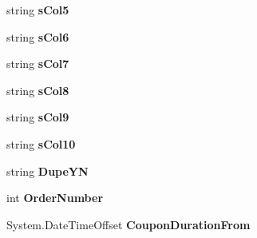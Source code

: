 \begin{DoxyCompactItemize}
\item 
string {\bfseries s\+Col5}\hypertarget{a00068_a726e903f1efbc702ac37385102cd91dd}{}\label{a00068_a726e903f1efbc702ac37385102cd91dd}

\item 
string {\bfseries s\+Col6}\hypertarget{a00068_a5d2ac8fd9022d7689df9229d6acc84b1}{}\label{a00068_a5d2ac8fd9022d7689df9229d6acc84b1}

\item 
string {\bfseries s\+Col7}\hypertarget{a00068_a310fe284da54bbe7d6f0714efd7588cb}{}\label{a00068_a310fe284da54bbe7d6f0714efd7588cb}

\item 
string {\bfseries s\+Col8}\hypertarget{a00068_ac529f8414e68bcd40d6aeb975978071a}{}\label{a00068_ac529f8414e68bcd40d6aeb975978071a}

\item 
string {\bfseries s\+Col9}\hypertarget{a00068_a145a1eff310db6ac8884c103132e803e}{}\label{a00068_a145a1eff310db6ac8884c103132e803e}

\item 
string {\bfseries s\+Col10}\hypertarget{a00068_a08fa2c457d90646b1fd02c13efd67c50}{}\label{a00068_a08fa2c457d90646b1fd02c13efd67c50}

\item 
string {\bfseries Dupe\+YN}\hypertarget{a00068_aaa6d5f543c3b75f1f7322628b0f87951}{}\label{a00068_aaa6d5f543c3b75f1f7322628b0f87951}

\item 
int {\bfseries Order\+Number}\hypertarget{a00068_a8756e6f92a0ae78fbbbb5ec209e7bbf9}{}\label{a00068_a8756e6f92a0ae78fbbbb5ec209e7bbf9}

\item 
System.\+Date\+Time\+Offset {\bfseries Coupon\+Duration\+From}\hypertarget{a00068_afde20825d6d5f6871477eeb6d1f45557}{}\label{a00068_afde20825d6d5f6871477eeb6d1f45557}


\end{DoxyCompactItemize}
